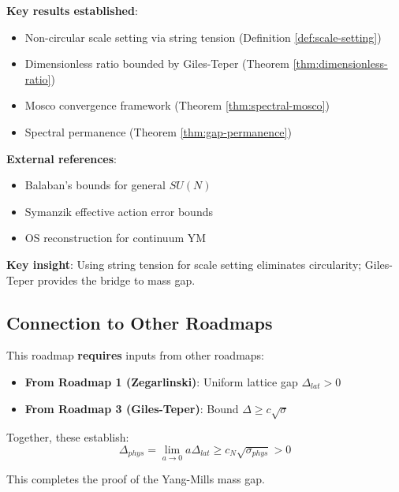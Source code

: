 \begin{summary}
\textbf{Key results established}:
\begin{itemize}
\item Non-circular scale setting via string tension (Definition \ref{def:scale-setting})
\item Dimensionless ratio bounded by Giles-Teper (Theorem \ref{thm:dimensionless-ratio})
\item Mosco convergence framework (Theorem \ref{thm:spectral-mosco})
\item Spectral permanence (Theorem \ref{thm:gap-permanence})
\end{itemize}

\textbf{External references}:
\begin{itemize}
\item Balaban's bounds for general $SU(N)$
\item Symanzik effective action error bounds
\item OS reconstruction for continuum YM
\end{itemize}

\textbf{Key insight}: Using string tension for scale setting eliminates 
circularity; Giles-Teper provides the bridge to mass gap.
\end{summary}

\subsection{Connection to Other Roadmaps}

\begin{remark}[Synthesis]
This roadmap \textbf{requires} inputs from other roadmaps:
\begin{itemize}
\item \textbf{From Roadmap 1 (Zegarlinski)}: Uniform lattice gap $\Delta_{lat} > 0$
\item \textbf{From Roadmap 3 (Giles-Teper)}: Bound $\Delta \geq c\sqrt{\sigma}$
\end{itemize}

Together, these establish:
\begin{equation}
\Delta_{phys} = \lim_{a \to 0} a \Delta_{lat} \geq c_N \sqrt{\sigma_{phys}} > 0
\end{equation}

This completes the proof of the Yang-Mills mass gap.
\end{remark}






